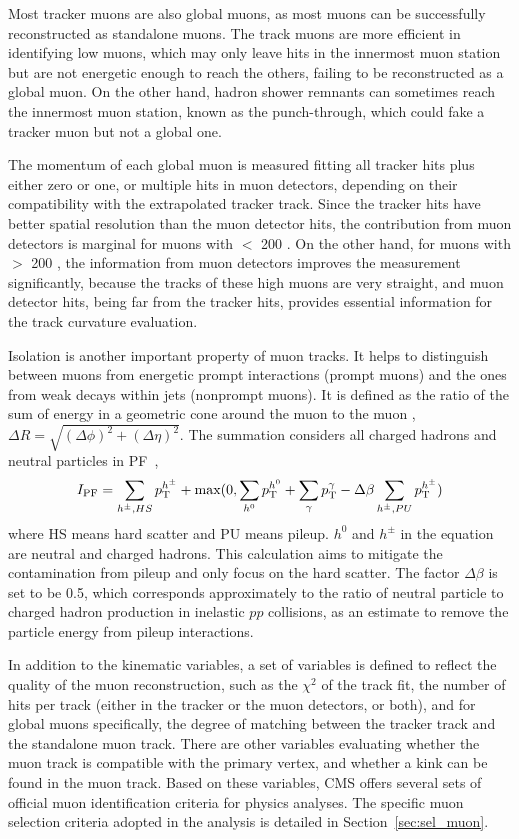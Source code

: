 Most tracker muons are also global muons, as most muons can be successfully reconstructed as standalone muons.
The track muons are more efficient in identifying low \pt muons, 
which may only leave hits in the innermost muon station but are not energetic enough to reach the others,
failing to be reconstructed as a global muon.
On the other hand, hadron shower remnants can sometimes reach the innermost muon station, 
known as the punch-through, which could fake a tracker muon but not a global one. 

The momentum of each global muon is measured fitting all tracker hits plus either zero or one, or multiple hits in muon detectors,
depending on their compatibility with the extrapolated tracker track.
Since the tracker hits have better spatial resolution than the muon detector hits, 
the contribution from muon detectors is marginal for muons with \pt $<$ 200 \GeV.
On the other hand, for muons with \pt $>$ 200 \GeV, the information from muon detectors improves the measurement significantly,
because the tracks of these high \pt muons are very straight, and muon detector hits, being far from the tracker hits,
provides essential information for the track curvature evaluation.

Isolation is another important property of muon tracks.
It helps to distinguish between muons from energetic prompt interactions (prompt muons) and the ones from weak decays within jets (nonprompt muons). 
It is defined as the ratio of the sum of energy in a geometric cone around the muon to the muon \pt, 
$\Delta{}R = \sqrt{(\Delta{}\phi)^{2} + (\Delta{}\eta)^{2}}$.
The summation considers all charged hadrons and neutral particles in PF~\cite{Sirunyan_2017},
\begin{equation}\label{eq:iso_def}
    I_{\text{PF}} = \sum_{h^{\pm}, HS} p_{\mathrm{T}}^{h^{\pm}} + \text{max}(0, \sum_{h^{0}} p_{\mathrm{T}}^{h^{0}} + \sum_{\gamma} p_{\mathrm{T}}^{\gamma} - \Delta\beta \sum_{h^{\pm}, PU} p_{\mathrm{T}}^{h^{\pm}})
\end{equation}
where HS means hard scatter and PU means pileup.
$h^{0}$ and $h^{\pm}$ in the equation are neutral and charged hadrons.
This calculation aims to mitigate the contamination from pileup and only focus on the hard scatter.
The factor $\Delta\beta$ is set to be 0.5, which corresponds approximately to the ratio of neutral particle to charged hadron production 
in inelastic $pp$ collisions, as an estimate to remove the particle energy from pileup interactions. 

In addition to the kinematic variables, a set of variables is defined to reflect the quality of the muon reconstruction,
such as the $\chi^{2}$ of the track fit, the number of hits per track (either in the tracker or the muon detectors, or both), 
and for global muons specifically, the degree of matching between the tracker track and the standalone muon track.
There are other variables evaluating whether the muon track is compatible with the primary vertex, 
and whether a kink can be found in the muon track.
Based on these variables, CMS offers several sets of official muon identification criteria for physics analyses.
The specific muon selection criteria adopted in the \hmm analysis is detailed in Section~\ref{sec:sel_muon}.


